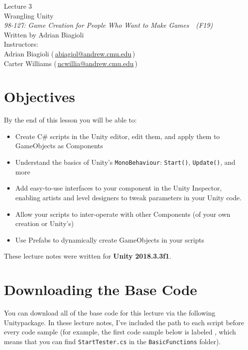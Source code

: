\documentclass[11pt]{article}
\makeatletter
\newcommand{\lecturenum}{3}
\newcommand{\lecturename}{Wrangling Unity}
\newcommand{\authorname}{Adrian Biagioli}
\newcommand{\coursenum}{98-127}
\newcommand{\coursename}{Game Creation for People Who Want to Make Games}
\newcommand{\coursesem}{F19}
\newcommand{\instructors}{Adrian Biagioli (\,\href{mailto:abiagiol@andrew.cmu.edu}{abiagiol@andrew.cmu.edu}\,) \\ Carter Williams (\,\href{mailto:ncwillia@andrew.cmu.edu}{ncwillia@andrew.cmu.edu}\,)}
\makeatother
\begin{document}
\thispagestyle{plain}
{
    \vspace{1.5em}
    \begin{center}
    {
        \huge
        Lecture \lecturenum \\
        \vspace{0.5em}
        \lecturename
        \vspace{0.4em}
    } \\
    {
        \it
        \coursenum: \coursename\ \ (\coursesem)
    } \\
    \vspace{1.0em}
    Written by \authorname \\
    \vspace{0.7em}
    Instructors:\\ \instructors
    \end{center}
}

\section{Objectives}

By the end of this lesson you will be able to:
\begin{itemize}
    \item Create C\# scripts in the Unity editor, edit them, and apply them to GameObjects as Components
    \item Understand the basics of Unity's \lstinline|MonoBehaviour|: \lstinline|Start()|, 
          \lstinline|Update()|, and more
    \item Add easy-to-use interfaces to your component in the Unity Inspector, enabling artists and
          level designers to tweak parameters in your Unity code.
    \item Allow your scripts to inter-operate with other Components (of your own creation or 
          Unity's)
    \item Use Prefabs to dynamically create GameObjects in your scripts
\end{itemize}

\noindent These lecture notes were written for {\bf Unity 2018.3.3f1}.

\section{Downloading the Base Code}

You can download all of the base code for this lecture via the following Unitypackage.  In these 
lecture notes, I've included the path to each script before every code sample (for example, the 
first code sample below is labeled , which means that you 
can find \lstinline|StartTester.cs| in the \lstinline|BasicFunctions| folder).
\end{document}
